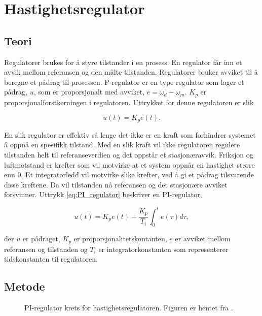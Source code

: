 \section{Hastighetsregulator}\label{sec:hastighetsreg}


\subsection{Teori}

Regulatorer brukes for å styre tilstander i en prosess. En regulator får inn et avvik mellom referansen og den målte tilstanden. Regulatorer bruker avviket til å beregne et pådrag til prosessen. P-regulator er en type regulator som lager et pådrag, $u$,  som er proporsjonalt med avviket, $e = \omega_d - \omega_m$. $K_p$ er proporsjonalforstkerningen i regulatoren. Uttrykket for denne regulatoren er slik

\begin{equation}
    \label{eq:P_regulator}
    u(t) = K_p e(t).
\end{equation}

En slik regulator er effektiv så lenge det ikke er en kraft som forhindrer systemet å oppnå en spesifikk tilstand. Med en slik kraft vil ikke regulatoren regulere tilstanden helt til referanseverdien og det oppstår et stasjonæravvik. Friksjon og luftmotstand er krefter som vil motvirke at et system oppnår en hastighet større enn $0$. Et integratorledd vil motvirke slike krefter, ved å gi et pådrag tilsvarende disse kreftene. Da vil tilstanden nå referansen og det stasjonære avviket forsvinner. Uttrykk \eqref{eq:PI_regulator} beskriver en PI-regulator,

\begin{equation}
    \label{eq:PI_regulator}
    u(t) = K_p e(t) + \frac{K_p}{T_i} \int_{0}^{t} e(\tau) d\tau,
\end{equation}

der $u$ er pådraget, $K_p$ er proporsjonalitetskontanten, $e$ er avviket mellom referansen og tilstanden og $T_i$ er integratorkonstanten som representerer tidskonstanten til regulatoren.







\subsection{Metode}

\begin{figure}[b]
    \centering
    
    \caption{PI-regulator krets for hastighetsregulatoren. Figuren er hentet fra \cite{AnalogMotorlabbOppgaver}.}
    \label{fig:krets_hastighets_regulator}
\end{figure}

